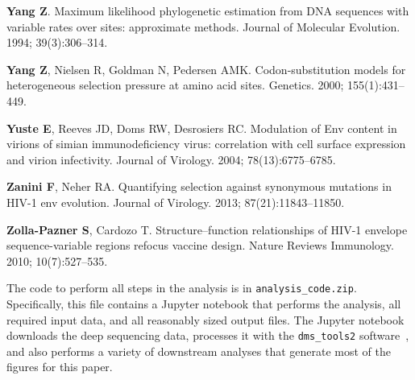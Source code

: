 \documentclass[9pt]{elife}
\begin{document}
\begin{thebibliography}{114}
\textbf{\color{eLifeMediumGrey} Yang Z}.
\newblock Maximum likelihood phylogenetic estimation from DNA sequences with
  variable rates over sites: approximate methods.
\newblock Journal of Molecular Evolution.  1994; 39(3):306--314.

\textbf{\color{eLifeMediumGrey} Yang Z}, Nielsen R, Goldman N, Pedersen AMK.
\newblock Codon-substitution models for heterogeneous selection pressure at
  amino acid sites.
\newblock Genetics.  2000; 155(1):431--449.

\textbf{\color{eLifeMediumGrey} Yuste E}, Reeves JD, Doms RW, Desrosiers RC.
\newblock Modulation of Env content in virions of simian immunodeficiency
  virus: correlation with cell surface expression and virion infectivity.
\newblock Journal of Virology.  2004; 78(13):6775--6785.

\textbf{\color{eLifeMediumGrey} Zanini F}, Neher RA.
\newblock Quantifying selection against synonymous mutations in HIV-1 env
  evolution.
\newblock Journal of Virology.  2013; 87(21):11843--11850.

\textbf{\color{eLifeMediumGrey} Zolla-Pazner S}, Cardozo T.
\newblock Structure--function relationships of HIV-1 envelope sequence-variable
  regions refocus vaccine design.
\newblock Nature Reviews Immunology.  2010; 10(7):527--535.

\end{thebibliography}


\clearpage

\begin{suppfile}
\caption{
\label{suppfile:code}
The code to perform all steps in the analysis is in \texttt{analysis\_code.zip}.
Specifically, this file contains a Jupyter notebook that performs the analysis, all required input data, and all reasonably sized output files.
The Jupyter notebook downloads the deep sequencing data, processes it with the \texttt{dms\_tools2} software~\citep[\url{https://jbloomlab.github.io/dms_tools2/}]{bloom2015software}, and also performs a variety of downstream analyses that generate most of the figures for this paper.
}
\end{suppfile}
\end{document}
